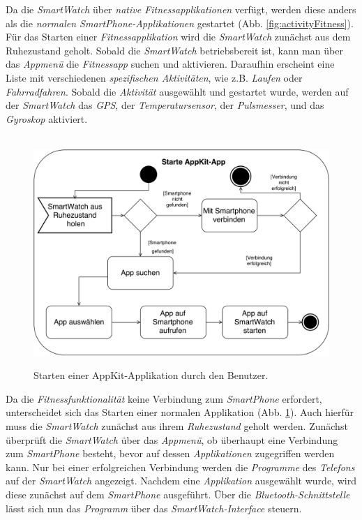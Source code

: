 Da die \textit{SmartWatch} über \textit{native Fitnessapplikationen} verfügt, werden diese anders als die \textit{normalen SmartPhone-Applikationen} gestartet (Abb. \ref{fig:activityFitness}).
Für das Starten einer \textit{Fitnessapplikation} wird die \textit{SmartWatch} zunächst aus dem Ruhezustand geholt. Sobald die \textit{SmartWatch} betriebsbereit ist, kann man über das \textit{Appmenü} die \textit{Fitnessapp} suchen und aktivieren. Daraufhin erscheint eine Liste mit verschiedenen \textit{spezifischen Aktivitäten}, wie z.B. \textit{Laufen} oder \textit{Fahrradfahren}. Sobald die \textit{Aktivität} ausgewählt und gestartet wurde, werden auf der \textit{SmartWatch} das \textit{GPS}, der \textit{Temperatursensor}, der \textit{Pulsmesser}, und das \textit{Gyroskop} aktiviert. \\
\begin{figure}[h]
\centering\
\includegraphics[width=\textwidth]{img/activityAppKit}
\caption{Starten einer AppKit-Applikation durch den Benutzer.}\label{fig:activityAppKit}
\end{figure}
Da die \textit{Fitnessfunktionalität} keine Verbindung zum \textit{SmartPhone} erfordert, unterscheidet sich das Starten einer normalen Applikation (Abb. \ref{fig:activityAppKit}). Auch hierfür muss die \textit{SmartWatch} zunächst aus ihrem \textit{Ruhezustand} geholt werden. Zunächst überprüft die \textit{SmartWatch} über das \textit{Appmenü}, ob überhaupt eine Verbindung zum \textit{SmartPhone} besteht, bevor auf dessen \textit{Applikationen} zugegriffen werden kann. Nur bei einer erfolgreichen Verbindung werden die \textit{Programme} des \textit{Telefons} auf der \textit{SmartWatch} angezeigt. Nachdem eine \textit{Applikation} ausgewählt wurde, wird diese zunächst auf dem \textit{SmartPhone} ausgeführt. Über die \textit{Bluetooth-Schnittstelle} lässt sich nun das \textit{Programm} über das \textit{SmartWatch-Interface} steuern.\\
